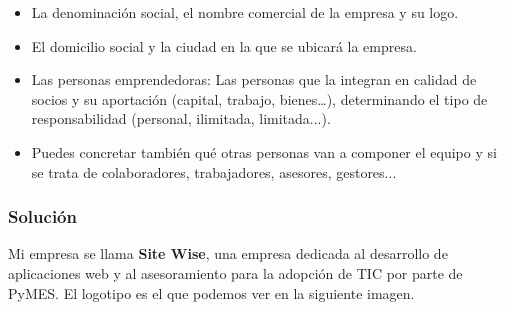 \begin{itemize}
    \item  La denominación social, el nombre comercial de la empresa y su logo.
    \item El domicilio social y la ciudad en la que se ubicará la empresa.
    \item Las personas emprendedoras: Las personas que la integran en calidad de socios y su aportación (capital, trabajo, bienes…), determinando el tipo de responsabilidad (personal, ilimitada, limitada...).
    \item Puedes concretar también qué otras personas van a componer el equipo y si se trata de colaboradores, trabajadores, asesores, gestores...
\end{itemize}

\subsubsection{Solución}

Mi empresa se llama \textbf{Site Wise}, una empresa dedicada al desarrollo de aplicaciones web y al asesoramiento para la adopción de TIC por parte de PyMES. El logotipo es el que podemos ver en la siguiente imagen.


%
%

